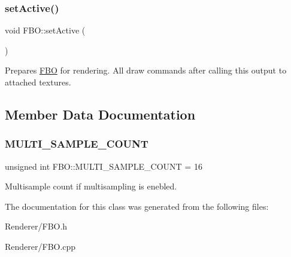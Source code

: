 \subsubsection{\texorpdfstring{setActive()}{setActive()}}
{\footnotesize\ttfamily void F\+B\+O\+::set\+Active (\begin{DoxyParamCaption}{ }\end{DoxyParamCaption})}

Prepares \mbox{\hyperlink{class_f_b_o}{F\+BO}} for rendering. All draw commands after calling this output to attached textures. 

\subsection{Member Data Documentation}
\mbox{\label{class_f_b_o_ac1a0e5bfd75a342c885ff5a90d8f4677}} 
\subsubsection{\texorpdfstring{MULTI\_SAMPLE\_COUNT}{MULTI\_SAMPLE\_COUNT}}
{\footnotesize\ttfamily unsigned int F\+B\+O\+::\+M\+U\+L\+T\+I\+\_\+\+S\+A\+M\+P\+L\+E\+\_\+\+C\+O\+U\+NT = 16\hspace{0.3cm}{\ttfamily [static]}}

Multisample count if multisampling is enebled. 

The documentation for this class was generated from the following files\+:\begin{DoxyCompactItemize}
\item 
Renderer/F\+B\+O.\+h\item 
Renderer/F\+B\+O.\+cpp\end{DoxyCompactItemize}

